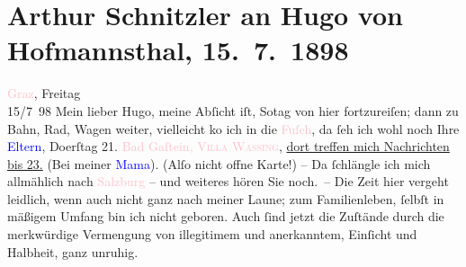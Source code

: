 

               \section[Arthur Schnitzler an Hugo von Hofmannsthal, 15. 7. 1898]{ Arthur Schnitzler an Hugo von Hofmannsthal, 15. 7. 1898}\nopagebreak{}\rehead{ }\normalsize\beginnumbering{} \toendnotes[C]{\smallbreak\pagebreak[2]} 
\toendnotes[C]{\smallbreak}\pstart
           \raggedleft{}{\pb}\textcolor{pink}{Graz}{}\ledrightnote{\textcolor{pink}{Graz}}, Freitag{\\}15/7 98\pend
           \pstart
           Mein lieber Hugo, meine Abſicht iſt, So{\geminationn}tag von hier fortzureiſen; dann zu
                    Bahn, Rad, Wagen weiter, vielleicht ko{\geminationm} ich in die
                        \textcolor{pink}{Fuſch}{}\ledrightnote{\textcolor{pink}{Bad Fusch}}, da ſeh ich wohl noch Ihre \textcolor{blue}{Eltern}{}, Do{\geminationn}erſtag 21.{ }\textcolor{pink}{\introOben{}Bad\introOben{} Gaſtein, \textsc{Villa
                            Wassing}}{}\ledrightnote{\textcolor{pink}{Villa Dr. Wassing}}, \uline{dort treffen mich Nachrichten bis
                            23.} (Bei meiner \textcolor{blue}{Mama}{}). \introOben{}(Alſo nicht offne Karte!)\introOben{} – Da{\geminationn}{ }ſchlängle ich mich allmählich nach \textcolor{pink}{Salzburg}{}\ledrightnote{\textcolor{pink}{Salzburg}} – und weiteres hören Sie noch. – Die Zeit
                    hier vergeht leidlich, wenn auch nicht ganz nach meiner Laune; zum
                    Familienleben, {\pb}ſelbſt in mäßigem Umfang bin ich
                    nicht geboren. Auch ſind jetzt die Zuſtände durch die merkwürdige Vermengung von
                    illegitimem und anerkanntem, Einſicht und Halbheit, ganz unruhig.\pend
